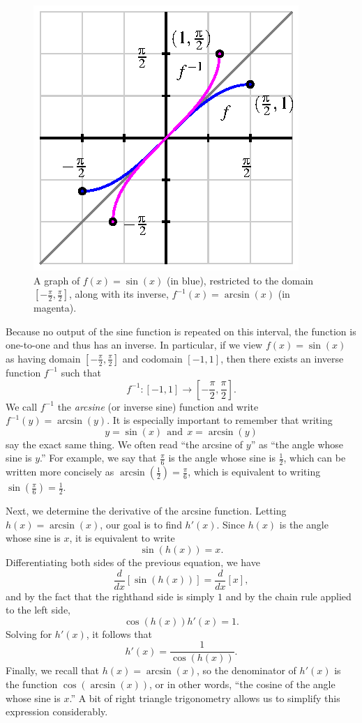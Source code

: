 \begin{figure}[h]
\begin{center}
\includegraphics{figures/2_6_arcsine.eps}
\caption{A graph of $f(x) = \sin(x)$ (in blue), restricted to the domain $[-\frac{\pi}{2}, \frac{\pi}{2}]$, along with its inverse, $f^{-1}(x) = \arcsin(x)$ (in magenta).} \label{F:2.6.arcsine}
\end{center}
\end{figure}

Because no output of the sine function is repeated on this interval, the function is one-to-one and thus has an inverse.  In particular, if we view $f(x) = \sin(x)$ as having domain $[-\frac{\pi}{2}, \frac{\pi}{2}]$ and codomain $[-1,1]$, then there exists an inverse function $f^{-1}$ such that
$$f^{-1} : [-1,1] \to [-\frac{\pi}{2}, \frac{\pi}{2}].$$
We call $f^{-1}$ the \emph{arcsine}  (or inverse sine) function and write $f^{-1}(y) = \arcsin(y).$  It is especially important to remember that writing
$$y = \sin(x) \ \ \mbox{and} \ \ x = \arcsin(y)$$
say the exact same thing.  We often read ``the arcsine of $y$'' as ``the angle whose sine is $y$.''  For example, we say that $\frac{\pi}{6}$ is the angle whose sine is $\frac{1}{2}$, which can be written more concisely as $\arcsin(\frac{1}{2}) = \frac{\pi}{6}$, which is equivalent to writing $\sin(\frac{\pi}{6}) = \frac{1}{2}.$

Next, we determine the derivative of the arcsine function.  Letting $h(x) = \arcsin(x)$, our goal is to find $h'(x)$.  Since $h(x)$ is the angle whose sine is $x$, it is equivalent to write
$$\sin(h(x)) = x.$$
Differentiating both sides of the previous equation, we have
$$\frac{d}{dx}[\sin(h(x))] = \frac{d}{dx}[x],$$
and by the fact that the righthand side is simply $1$ and by the chain rule applied to the left side,
$$\cos(h(x)) h'(x) = 1.$$
Solving for $h'(x)$, it follows that
$$h'(x) = \frac{1}{\cos(h(x))}.$$
Finally, we recall that $h(x) = \arcsin(x)$, so the denominator of $h'(x)$ is the function $\cos(\arcsin(x))$, or in other words, ``the cosine of the angle whose sine is $x$.''  A bit of right triangle trigonometry allows us to simplify this expression considerably.

